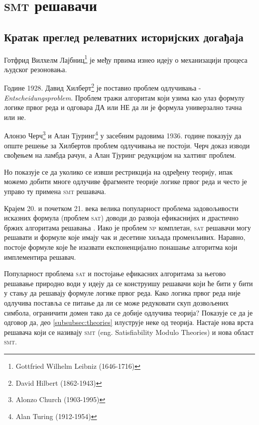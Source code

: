 \documentclass[a4paper]{article}
\begin{document}
\section{\textsc{smt} решавачи}
\label{sec:smtSolver}
\subsection{Кратак преглед релеватних историјских догађаја}
Готфрид Вилхелм Лајбниц\footnote{Gottfried Wilhelm Leibniz (1646-1716)} је међу првима изнео идеју
о механизацији процеса људског резоновања.

Године 1928. Давид Хилберт\footnote{David Hilbert (1862-1943)} је поставио проблем одлучивања - \emph{Entscheidungsproblem}.
Проблем тражи алгоритам који узима као улаз формулу логике првог реда и одговара ДА или НЕ да ли је формула универзално
тачна или не.

Алонзо Черч\footnote{Alonzo Church (1903-1995)} и Алан Тјуринг\footnote{Alan Turing (1912-1954)} у засебним радовима 1936. године показују да опште решење за Хилбертов проблем одлучивања
не постоји. Черч доказ изводи свођењем на ламбда рачун, а Алан Тјуринг редукцијом на халтинг проблем.

Но показује се да уколико се извши рестрикција на одређену теорију, ипак можемо добити многе одлучиве фрагменте теорије логике
првог реда и често је управо ту примена \textsc{smt} решавача.

Крајем 20. и почетком 21. века велика популарност проблема задовољивости исказних формула (проблем \textsc{sat}) доводи до развоја
ефикаснијих и драстично бржих алгоритама решавања \cite{satcdcl1, satcdcl2, satcdcl3}. Иако је проблем \textsc{np} комплетан,
\textsc{sat} решавачи могу решавати и формуле које имају чак и десетине хиљада променљивих. Наравно, постоје формуле које ће изазвати
експоненцијално понашање алгоритма који имплементира решавач.

Популарност проблема \textsc{sat} и постојање ефикасних алгоритама за његово решавање
природно води у идеју да се конструишу решавачи који ће бити у бити у стању да решавају
формуле логике првог реда. Како логика првог реда није одлучива поставља се питање да ли се може
редуковати скуп дозвољених симбола, ограничити домен тако да се добије одлучива теорија?
Показује се да је одговор да, део \ref{subsubsec:theories} илуструје неке од теорија.
Настаје нова врста решавача који се називају \textsc{smt} (eng. Satisfiability Modulo Theories) и нова област \textsc{smt}.
\end{document}
